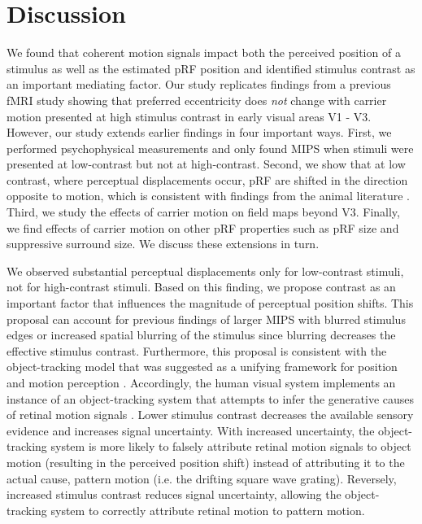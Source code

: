 \section{Discussion}
We found that coherent motion signals impact both the perceived position of a stimulus as well as the estimated pRF position and identified stimulus contrast as an important mediating factor. Our study replicates findings from a previous fMRI study showing that preferred eccentricity does \textit{not} change with carrier motion presented at high stimulus contrast in early visual areas V1 - V3. However, our study extends earlier findings in four important ways. First, we performed psychophysical measurements and only found MIPS when stimuli were presented at low-contrast but not at high-contrast. Second, we show that at low contrast, where perceptual displacements occur, pRF are shifted in the direction opposite to motion, which is consistent with findings from the animal literature \parencite{Fu2004}. Third, we study the effects of carrier motion on field maps beyond V3. Finally, we find effects of carrier motion on other pRF properties such as pRF size and suppressive surround size. We discuss these extensions in turn.

We observed substantial perceptual displacements only for low-contrast stimuli, not for high-contrast stimuli. Based on this finding, we propose contrast as an important factor that influences the magnitude of perceptual position shifts. This proposal can account for previous findings of larger MIPS with blurred stimulus edges \parencite{Fu2001, Kwon2015} or increased spatial blurring of the stimulus \parencite{Fu2001} since blurring decreases the effective stimulus contrast. Furthermore, this proposal is consistent with the object-tracking model that was suggested as a unifying framework for position and motion perception \parencite{Kwon2015}. Accordingly, the human visual system implements an instance of an object-tracking system that attempts to infer the generative causes of retinal motion signals \parencite{Kwon2015}. Lower stimulus contrast decreases the available sensory evidence and increases signal uncertainty. With increased uncertainty, the object-tracking system is more likely to falsely attribute retinal motion signals to object motion (resulting in the perceived position shift) instead of attributing it to the actual cause, pattern motion (i.e. the drifting square wave grating). Reversely, increased stimulus contrast reduces signal uncertainty, allowing the object-tracking system to correctly attribute retinal motion to pattern motion.

